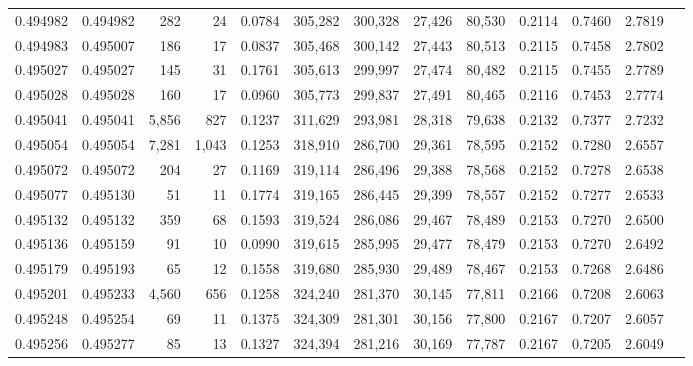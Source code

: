 \begin{tabular}{rrrrrrrrrrrrr}
0.494982 & 0.494982 &   282 &    24 &                                     0.0784 & 305,282 & 300,328 &  27,426 &  80,530 & 0.2114 & 0.7460 & 2.7819 \\
0.494983 & 0.495007 &   186 &    17 &                                     0.0837 & 305,468 & 300,142 &  27,443 &  80,513 & 0.2115 & 0.7458 & 2.7802 \\
0.495027 & 0.495027 &   145 &    31 &                                     0.1761 & 305,613 & 299,997 &  27,474 &  80,482 & 0.2115 & 0.7455 & 2.7789 \\
0.495028 & 0.495028 &   160 &    17 &                                     0.0960 & 305,773 & 299,837 &  27,491 &  80,465 & 0.2116 & 0.7453 & 2.7774 \\
0.495041 & 0.495041 & 5,856 &   827 &                                     0.1237 & 311,629 & 293,981 &  28,318 &  79,638 & 0.2132 & 0.7377 & 2.7232 \\
0.495054 & 0.495054 & 7,281 & 1,043 &                                     0.1253 & 318,910 & 286,700 &  29,361 &  78,595 & 0.2152 & 0.7280 & 2.6557 \\
0.495072 & 0.495072 &   204 &    27 &                                     0.1169 & 319,114 & 286,496 &  29,388 &  78,568 & 0.2152 & 0.7278 & 2.6538 \\
0.495077 & 0.495130 &    51 &    11 &                                     0.1774 & 319,165 & 286,445 &  29,399 &  78,557 & 0.2152 & 0.7277 & 2.6533 \\
0.495132 & 0.495132 &   359 &    68 &                                     0.1593 & 319,524 & 286,086 &  29,467 &  78,489 & 0.2153 & 0.7270 & 2.6500 \\
0.495136 & 0.495159 &    91 &    10 &                                     0.0990 & 319,615 & 285,995 &  29,477 &  78,479 & 0.2153 & 0.7270 & 2.6492 \\
0.495179 & 0.495193 &    65 &    12 &                                     0.1558 & 319,680 & 285,930 &  29,489 &  78,467 & 0.2153 & 0.7268 & 2.6486 \\
0.495201 & 0.495233 & 4,560 &   656 &                                     0.1258 & 324,240 & 281,370 &  30,145 &  77,811 & 0.2166 & 0.7208 & 2.6063 \\
0.495248 & 0.495254 &    69 &    11 &                                     0.1375 & 324,309 & 281,301 &  30,156 &  77,800 & 0.2167 & 0.7207 & 2.6057 \\
0.495256 & 0.495277 &    85 &    13 &                                     0.1327 & 324,394 & 281,216 &  30,169 &  77,787 & 0.2167 & 0.7205 & 2.6049 \\

\end{tabular}
